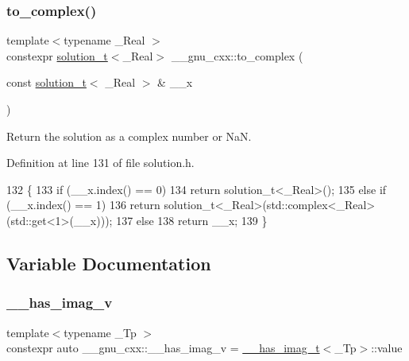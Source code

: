 \subsubsection{\texorpdfstring{to\+\_\+complex()}{to\_complex()}}
{\footnotesize\ttfamily template$<$typename \+\_\+\+Real $>$ \\
constexpr \hyperlink{namespace____gnu__cxx_ae20ea642de50eb361074c62676b0159c}{solution\+\_\+t}$<$\+\_\+\+Real$>$ \+\_\+\+\_\+gnu\+\_\+cxx\+::to\+\_\+complex (\begin{DoxyParamCaption}\item[{const \hyperlink{namespace____gnu__cxx_ae20ea642de50eb361074c62676b0159c}{solution\+\_\+t}$<$ \+\_\+\+Real $>$ \&}]{\+\_\+\+\_\+x }\end{DoxyParamCaption})}

Return the solution as a complex number or NaN. 

Definition at line 131 of file solution.\+h.


\begin{DoxyCode}
132     \{
133       \textcolor{keywordflow}{if} (\_\_x.index() == 0)
134         \textcolor{keywordflow}{return} solution\_t<\_Real>();
135       \textcolor{keywordflow}{else} \textcolor{keywordflow}{if} (\_\_x.index() == 1)
136         \textcolor{keywordflow}{return} solution\_t<\_Real>(std::complex<\_Real>(std::get<1>(\_\_x)));
137       \textcolor{keywordflow}{else}
138         \textcolor{keywordflow}{return} \_\_x;
139     \}
\end{DoxyCode}


\subsection{Variable Documentation}
\mbox{\label{namespace____gnu__cxx_afa2404a914b06f950f3a46e75aca51a9}} 
\subsubsection{\texorpdfstring{\+\_\+\+\_\+has\+\_\+imag\+\_\+v}{\_\_has\_imag\_v}}
{\footnotesize\ttfamily template$<$typename \+\_\+\+Tp $>$ \\
constexpr auto \+\_\+\+\_\+gnu\+\_\+cxx\+::\+\_\+\+\_\+has\+\_\+imag\+\_\+v = \hyperlink{struct____gnu__cxx_1_1____has__imag__t}{\+\_\+\+\_\+has\+\_\+imag\+\_\+t}$<$\+\_\+\+Tp$>$\+::value}



